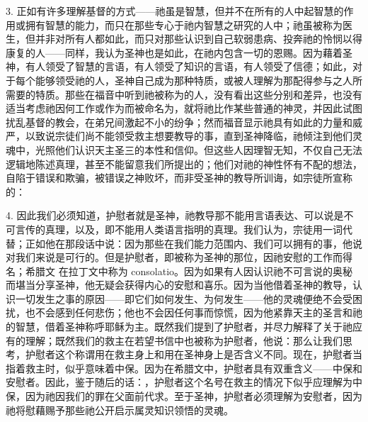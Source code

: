 3. 正如有许多理解基督的方式——祂虽是智慧，但并不在所有的人中起智慧的作用或拥有智慧的能力，而只在那些专心于祂内智慧之研究的人中；祂虽被称为医生，但并非对所有人都如此，而只对那些认识到自己软弱患病、投奔祂的怜悯以得康复的人——同样，我认为圣神也是如此，在祂内包含一切的恩赐。因为藉着圣神，有人领受了智慧的言语，有人领受了知识的言语，有人领受了信德；如此，对于每个能够领受祂的人，圣神自己成为那种特质，或被人理解为那配得参与之人所需要的特质。那些在福音中听到祂被称为的人，没有看出这些分别和差异，也没有适当考虑祂因何工作或作为而被命名为，就将祂比作某些普通的神灵，并因此试图扰乱基督的教会，在弟兄间激起不小的纷争；然而福音显示祂具有如此的力量和威严，以致说宗徒们尚不能领受救主想要教导的事，直到圣神降临，祂倾注到他们灵魂中，光照他们认识天主圣三的本性和信仰。但这些人因理智无知，不仅自己无法逻辑地陈述真理，甚至不能留意我们所提出的；他们对祂的神性怀有不配的想法，自陷于错误和欺骗，被错误之神败坏，而非受圣神的教导所训诲，如宗徒所宣称的：\par

4. 因此我们必须知道，护慰者就是圣神，祂教导那不能用言语表达、可以说是不可言传的真理，以及，即不能用人类语言指明的真理。我们认为，宗徒用一词代替；正如他在那段话中说：因为那些在我们能力范围内、我们可以拥有的事，他说对我们来说是可行的。但是护慰者，即被称为圣神的那位，因祂安慰的工作而得名；希腊文  在拉丁文中称为 consolatio。因为如果有人因认识祂不可言说的奥秘而堪当分享圣神，他无疑会获得内心的安慰和喜乐。因为当他借着圣神的教导，认识一切发生之事的原因——即它们如何发生、为何发生——他的灵魂便绝不会受困扰，也不会感到任何悲伤；他也不会因任何事而惊慌，因为他紧靠天主的圣言和祂的智慧，借着圣神称呼耶稣为主。既然我们提到了护慰者，并尽力解释了关于祂应有的理解；既然我们的救主在若望书信中也被称为护慰者，他说：那么让我们思考，护慰者这个称谓用在救主身上和用在圣神身上是否含义不同。现在，护慰者当指着救主时，似乎意味着中保。因为在希腊文中，护慰者具有双重含义——中保和安慰者。因此，鉴于随后的话：，护慰者这个名号在救主的情况下似乎应理解为中保，因为祂因我们的罪在父面前代求。至于圣神，护慰者必须理解为安慰者，因为祂将慰藉赐予那些祂公开启示属灵知识领悟的灵魂。\par

